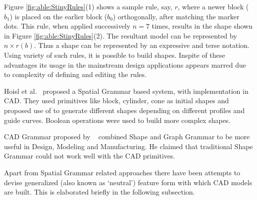 
	
Figure \ref{fig:able:StinyRules}(1) shows a sample rule, say, $r$, where a newer block ($b_1$) is placed on the earlier block  ($b_0$) orthogonally, after matching the marker dots. This rule, when applied successively $n=7$ times, results in the shape shown in Figure \ref{fig:able:StinyRules}(2). The resultant model can be represented by $n \times r(b)$. Thus a shape can be represented by an expressive and terse notation. Using variety of such rules, it is possible to build shapes. Inspite of these advantages its usage in the mainstream design applications appears marred due to complexity of defining and editing the rules.

Hoisl et al.~\cite{Hoisl2009} proposed a Spatial Grammar based system, with implementation in CAD. They used primitives like block, cylinder, cone as initial shapes and proposed use of  to generate different shapes depending on different profiles and guide curves. Boolean operations were used to build more complex shapes. 

CAD Grammar proposed by ~\cite{Deak2006} combined Shape and Graph Grammar to be more useful in Design, Modeling and Manufacturing. He claimed that traditional Shape Grammar could not work well with the CAD primitives.


Apart from Spatial Grammar related approaches there have been attempts to devise generalized (also known as `neutral') feature form with which CAD models are built. This is elaborated briefly in the following subsection. %


%


